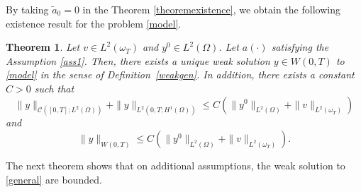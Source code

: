 \documentclass[reqno,twoside]{amsart}
\numberwithin{equation}{section}
\newtheorem{theorem}{Theorem}[section]
\theoremstyle{definition}
\newtheorem{definition}[theorem]{Definition}
\newtheorem{remark}[theorem]{Remark}
\numberwithin{equation}{section}
\def \dis {\displaystyle}
\def \C {\mathcal{C}}
\def \C {{\mathcal C}}
\def \dx{\mathrm{d}x}
\def \dt{\mathrm{d}t}
\def \dq {\mathrm{d}x \, \mathrm{d}t}
\def \C {\mathcal{C}}
\def \C {{\mathcal C}}
\begin{document}
%
By taking $\tilde{a}_0=0$ in the Theorem \ref{theoremexistence}, we obtain the following existence result for the problem \eqref{model}.
\begin{theorem}\label{theoremexistence0}
	Let  $v\in L^2(\omega_T)$ and $y^{0}\in L^2(\Omega)$. Let $a(\cdot)$ satisfying the Assumption \ref{ass1}.  Then, there exists a unique weak solution $y \in W(0,T)$ to \eqref{model} in the sense of Definition~\ref{weakgen}.
	In addition, there exists a constant $C>0$ such that
	\begin{equation}\label{estimation0}
		\|y\|_{\C([0,T];L^2(\Omega))}+ \|y\|_{L^2(0,T;H^1(\Omega))} \leq C\left(\|y^0\|_{L^2(\Omega)}+\|v\|_{L^2(\omega_T)}\right)
	\end{equation}
	and
	\begin{equation}\label{estimation00}
		\|y\|_{W(0,T)}\leq C\left(\|y^0\|_{L^2(\Omega)}+\|v\|_{L^2(\omega_T)}\right).
	\end{equation}
\end{theorem}
The next theorem shows that on additional assumptions, the weak solution to \eqref{general} are bounded.
\end{document}
